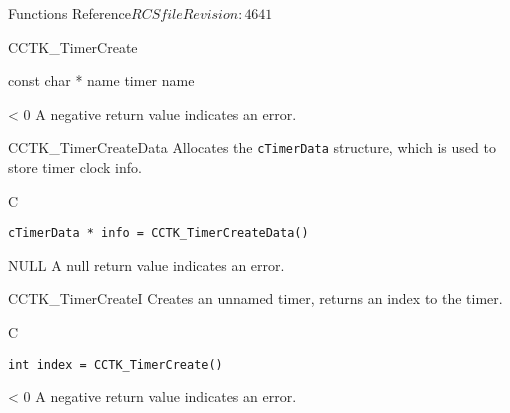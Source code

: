 \begin{cactuspart}{ Functions Reference}{$RCSfile$}{$Revision: 4641 $}
\begin{FunctionDescription}{CCTK\_TimerCreate}
\begin{ParameterSection}
\begin{Parameter} {const char * name}
timer name
\end{Parameter}
\end{ParameterSection}

\begin{ErrorSection}
\begin{Error}{< 0}
A negative return value indicates an error.
\end{Error}
\end{ErrorSection}
\end{FunctionDescription}

\begin{FunctionDescription}{CCTK\_TimerCreateData}
\label{CCTK-TimerCreateData}
Allocates the {\tt cTimerData}
structure, which is used to store timer clock info.

\begin{SynopsisSection}
\begin{Synopsis}{C}
\begin{verbatim}
cTimerData * info = CCTK_TimerCreateData()
\end{verbatim}
\end{Synopsis}
\end{SynopsisSection}

\begin{ErrorSection}
\begin{Error}{NULL}
A null return value indicates an error.
\end{Error}
\end{ErrorSection}
\end{FunctionDescription}


\begin{FunctionDescription}{CCTK\_TimerCreateI}
\label{CCTK-TimerCreateI}
Creates an unnamed timer, returns an index to the timer.
\begin{SynopsisSection}
\begin{Synopsis}{C}
\begin{verbatim}
int index = CCTK_TimerCreate()
\end{verbatim}
\end{Synopsis}
\end{SynopsisSection}

\begin{ErrorSection}
\begin{Error}{< 0}
A negative return value indicates an error.
\end{Error}
\end{ErrorSection}
\end{FunctionDescription}



\end{cactuspart}
